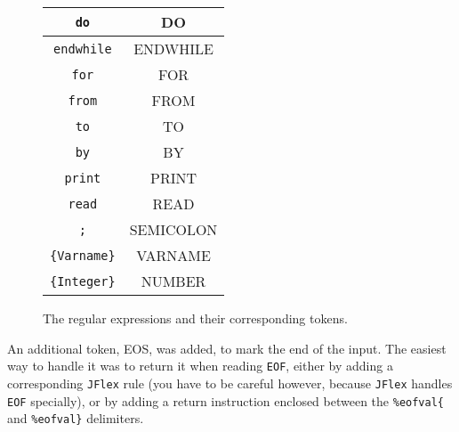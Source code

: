 \documentclass[a4paper]{article}
\newcommand{\JFlex}{\texttt{JFlex}\xspace}
\begin{document}
\begin{figure}[ht]
\begin{tabular}{|c|c|}
  \hline
  \texttt{do}               & DO        \\
  \hline
  \texttt{endwhile}         & ENDWHILE  \\
  \hline
  \texttt{for}              & FOR       \\
  \hline
  \texttt{from}             & FROM        \\
  \hline
  \texttt{to}               & TO        \\
  \hline
  \texttt{by}               & BY        \\
  \hline
  \texttt{print}            & PRINT     \\
  \hline
  \texttt{read}             & READ      \\
  \hline
  \texttt{;}                & SEMICOLON        \\
  \hline
  \texttt{\{Varname\}}      & VARNAME   \\
  \hline
  \texttt{\{Integer\}}      & NUMBER    \\
  \hline
\end{tabular}
\caption{The regular expressions and their corresponding tokens.}
\label{fig:tokens}
\end{figure}

An additional token, EOS, was added, to mark the end of the input. The easiest way to handle it was to return it when reading \texttt{EOF}, either by adding a corresponding \JFlex rule (you have to be careful however, because \JFlex handles \texttt{EOF} specially), or by adding a return instruction enclosed between the \texttt{\%eofval\{} and \texttt{\%eofval\}} delimiters.
\end{document}
